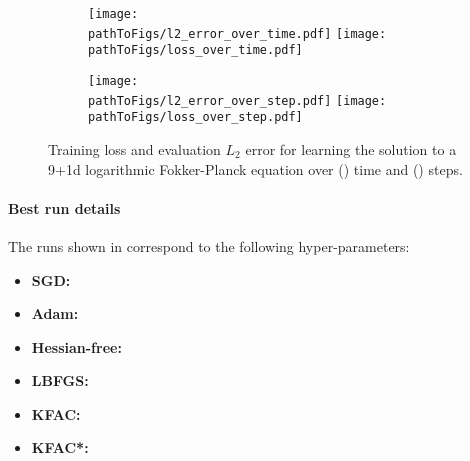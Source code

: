 \begin{figure}[!h]
  \centering
  \def\pathToFigs{kfac_pinns_exp/exp43_log_fokker_planck9d_isotropic_gaussian_random}
  \begin{subfigure}[t]{1.0\linewidth}
    \caption{}\label{subfig:log_fokker_planck_10d-time}
    \texttt{[image: \\pathToFigs/l2\_error\_over\_time.pdf]}
    \texttt{[image: \\pathToFigs/loss\_over\_time.pdf]}
  \end{subfigure}
  \begin{subfigure}[t]{1.0\linewidth}
    \caption{}\label{subfig:log_fokker_planck_10d-step}
    \texttt{[image: \\pathToFigs/l2\_error\_over\_step.pdf]}
    \texttt{[image: \\pathToFigs/loss\_over\_step.pdf]}
  \end{subfigure}
  \caption{Training loss and evaluation $L_2$ error for learning the solution to a 9+1d logarithmic Fokker-Planck equation over () time and () steps.}\label{fig:log_fokker_planck_10d-appendix}
\end{figure}

\paragraph{Best run details} The runs shown in  correspond to the following hyper-parameters:

\begin{itemize}
  \def\pathToRuns{kfac_pinns_exp/exp43_log_fokker_planck9d_isotropic_gaussian_random/tex}
\item \textbf{SGD:} 
\item \textbf{Adam:} 
\item \textbf{Hessian-free:} 
\item \textbf{LBFGS:} 
\item \textbf{KFAC:} 
\item \textbf{KFAC*:} 
\end{itemize}

